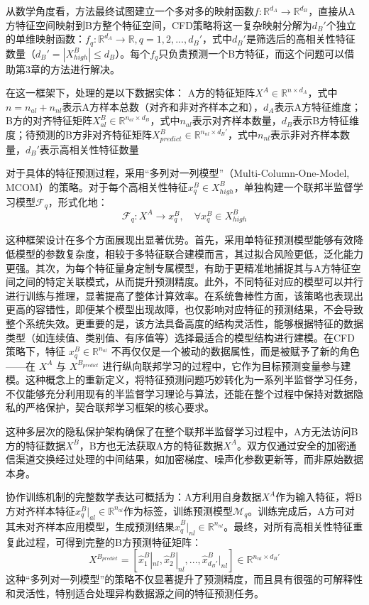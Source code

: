 从数学角度看，方法最终试图建立一个多对多的映射函数$f: \mathbb{R}^{d_A} \rightarrow \mathbb{R}^{d_B}$，直接从A方特征空间映射到B方整个特征空间，CFD策略将这一复杂映射分解为$d_B'$个独立的单维映射函数：$f_q: \mathbb{R}^{d_A} \rightarrow \mathbb{R}, q = 1, 2, ..., d_B'$，式中$d_B'$是筛选后的高相关性特征数量（$d_B' = |X^B_{high}| \leq d_B$）。每个$f_q$只负责预测一个B方特征，而这个问题可以借助第3章的方法进行解决。

在这一框架下，处理的是以下数据实体：
A方的特征矩阵$X^A \in \mathbb{R}^{n \times d_A}$，式中$n = n_{al} + n_{nl}$表示A方样本总数（对齐和非对齐样本之和），$d_A$表示A方特征维度； B方的对齐特征矩阵$X^B_{al} \in \mathbb{R}^{n_{al} \times d_B}$，式中$n_{al}$表示对齐样本数量，$d_B$表示B方特征维度；待预测的B方非对齐特征矩阵$X^B_{predict} \in \mathbb{R}^{n_{nl} \times d_B'}$，式中$n_{nl}$表示非对齐样本数量，$d_B'$表示高相关性特征数量

对于具体的特征预测过程，采用“多列对一列模型”（Multi-Column-One-Model, MCOM）的策略。对于每个高相关性特征$x^B_q \in X^B_{high}$，单独构建一个联邦半监督学习模型$\mathcal{F}_q$，形式化地：
\begin{equation}
	\mathcal{F}_q: X^A \rightarrow x^B_q, \quad \forall x^B_q \in X^B_{high}
\end{equation}

这种框架设计在多个方面展现出显著优势。首先，采用单特征预测模型能够有效降低模型的参数复杂度，相较于多特征联合建模而言，其过拟合风险更低，泛化能力更强。其次，为每个特征量身定制专属模型，有助于更精准地捕捉其与A方特征空间之间的特定关联模式，从而提升预测精度。此外，不同特征对应的模型可以并行进行训练与推理，显著提高了整体计算效率。在系统鲁棒性方面，该策略也表现出更高的容错性，即便某个模型出现故障，也仅影响对应特征的预测结果，不会导致整个系统失效。更重要的是，该方法具备高度的结构灵活性，能够根据特征的数据类型（如连续值、类别值、有序值等）选择最适合的模型结构进行建模。在CFD策略下，特征 $x^B_q \in \mathbb{R}^{n_{al}}$ 不再仅仅是一个被动的数据属性，而是被赋予了新的角色——在 $X^A$ 与 $X^{B_{predict}}$ 进行纵向联邦学习的过程中，它作为目标预测变量参与建模。这种概念上的重新定义，将特征预测问题巧妙转化为一系列半监督学习任务，不仅能够充分利用现有的半监督学习理论与算法，还能在整个过程中保持对数据隐私的严格保护，契合联邦学习框架的核心要求。

这种多层次的隐私保护架构确保了在整个联邦半监督学习过程中，A方无法访问B方的特征数据$X^B$，B方也无法获取A方的特征数据$X^A$。双方仅通过安全的加密通信渠道交换经过处理的中间结果，如加密梯度、噪声化参数更新等，而非原始数据本身。

协作训练机制的完整数学表达可概括为：A方利用自身数据$X^A$作为输入特征，将B方对齐样本特征$x^B_q|_{al} \in \mathbb{R}^{n_{al}}$作为标签，训练预测模型$\mathcal{M}_q$。训练完成后，A方可对其未对齐样本应用模型，生成预测结果$\hat{x}^B_q|_{nl} \in \mathbb{R}^{n_{nl}}$。最终，对所有高相关性特征重复此过程，可得到完整的B方预测特征矩阵：
\begin{equation}
	X^{B_{predict}} = [\hat{x}^B_1|_{nl}, \hat{x}^B_2|_{nl}, ..., \hat{x}^B_{d_B'}|_{nl}] \in \mathbb{R}^{n_{nl} \times d_B'}
\end{equation}
这种“多列对一列模型”的策略不仅显著提升了预测精度，而且具有很强的可解释性和灵活性，特别适合处理异构数据源之间的特征预测任务。

